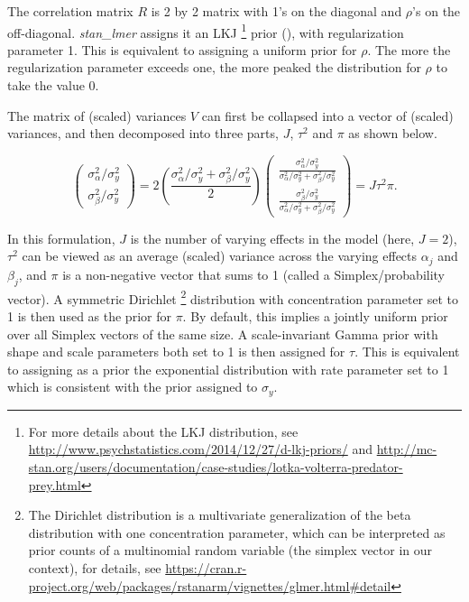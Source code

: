 The correlation matrix $R$ is 2 by 2 matrix with 1's on the diagonal and $\rho$'s on the off-diagonal. \textit{stan\_lmer} assigns it an LKJ \footnote{For more details about the LKJ distribution, see \url{http://www.psychstatistics.com/2014/12/27/d-lkj-priors/} and \url{http://mc-stan.org/users/documentation/case-studies/lotka-volterra-predator-prey.html}} prior (\cite{lewandowski2009generating}), with regularization parameter 1.  This is equivalent to assigning a uniform prior for $\rho$.  The more the regularization parameter exceeds one, the more peaked the distribution for $\rho$ to take the value 0.  

The matrix of (scaled) variances $V$ can first be collapsed into a vector of (scaled) variances, and then decomposed into three parts, $J$, $\tau^2$ and $\pi$ as shown below. 

$$
\left(\begin{matrix} 
\sigma_\alpha^2/\sigma_y^2 \\ 
\sigma_\beta^2/\sigma_y^2 
\end{matrix} \right) = 
2\left(\frac{\sigma_\alpha^2/\sigma_y^2 + \sigma_\beta^2/\sigma_y^2}{2}\right)\left(\begin{matrix} 
\frac{\sigma_\alpha^2/\sigma_y^2}{\sigma_\alpha^2/\sigma_y^2 + \sigma_\beta^2/\sigma_y^2} \\ 
\frac{\sigma_\beta^2/\sigma_y^2}{\sigma_\alpha^2/\sigma_y^2 + \sigma_\beta^2/\sigma_y^2} 
\end{matrix} \right)=
J\tau^2 \pi. 
$$  

In this formulation, $J$ is the number of varying effects in the model (here, $J=2$), $\tau^2$ can be viewed as an average (scaled) variance across the varying effects $\alpha_j$ and $\beta_j$, and $\pi$ is a non-negative vector that sums to 1 (called a Simplex/probability vector).  A symmetric Dirichlet \footnote{The Dirichlet distribution is a multivariate generalization of the beta distribution with one concentration parameter, which can be interpreted as prior counts of a multinomial random variable (the simplex vector in our context), for details, see \url{https://cran.r-project.org/web/packages/rstanarm/vignettes/glmer.html\#detail}} distribution with concentration parameter set to 1 is then used as the prior for $\pi$.  By default, this implies a jointly uniform prior over all Simplex vectors of the same size.  A scale-invariant Gamma prior with shape and scale parameters both set to 1 is then assigned for $\tau$.  This is equivalent to assigning as a prior the exponential distribution with rate parameter set to 1 which is consistent with the prior assigned to $\sigma_y$. 




